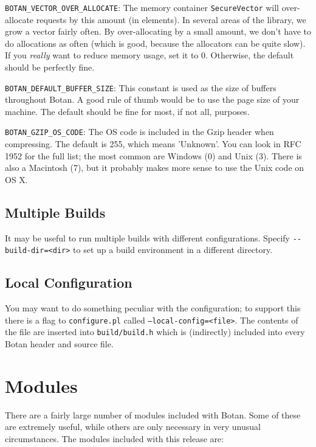 \documentclass{article}
\newcommand{\filename}[1]{\texttt{#1}}
\newcommand{\type}[1]{\texttt{#1}}
\newcommand{\macro}[1]{\texttt{#1}}
\begin{document}
\macro{BOTAN\_VECTOR\_OVER\_ALLOCATE}: The memory container
\type{SecureVector} will over-allocate requests by this amount (in
elements). In several areas of the library, we grow a vector fairly often. By
over-allocating by a small amount, we don't have to do allocations as often
(which is good, because the allocators can be quite slow). If you \emph{really}
want to reduce memory usage, set it to 0. Otherwise, the default should be
perfectly fine.

\macro{BOTAN\_DEFAULT\_BUFFER\_SIZE}: This constant is used as the size of
buffers throughout Botan. A good rule of thumb would be to use the page size of
your machine. The default should be fine for most, if not all, purposes.

\macro{BOTAN\_GZIP\_OS\_CODE}: The OS code is included in the Gzip header when
compressing. The default is 255, which means 'Unknown'. You can look in RFC
1952 for the full list; the most common are Windows (0) and Unix (3). There is
also a Macintosh (7), but it probably makes more sense to use the Unix code on
OS X.

\subsection{Multiple Builds}

It may be useful to run multiple builds with different
configurations. Specify \verb|--build-dir=<dir>| to set up a build
environment in a different directory.

\subsection{Local Configuration}

You may want to do something peculiar with the configuration; to
support this there is a flag to \filename{configure.pl} called
\texttt{--local-config=<file>}. The contents of the file are inserted into
\filename{build/build.h} which is (indirectly) included into every
Botan header and source file.

\pagebreak

\section{Modules}

There are a fairly large number of modules included with Botan. Some
of these are extremely useful, while others are only necessary in very
unusual circumstances. The modules included with this release are:
\end{document}
